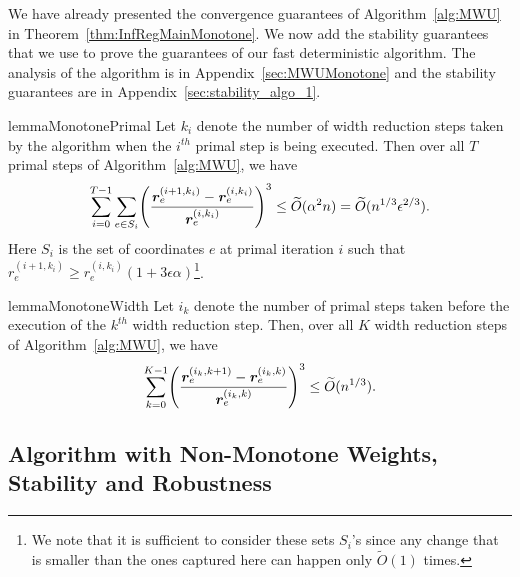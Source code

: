 \documentclass[11pt]{article}
\let\originalleft\left
\let\originalright\right
\renewcommand{\left}{\mathopen{}\mathclose\bgroup\originalleft}
\renewcommand{\right}{\aftergroup\egroup\originalright}
\newcommand\rr{\boldsymbol{\mathit{r}}}
\newcommand\Otil{\widetilde{O}}
\begin{document}
We have already presented the convergence guarantees of Algorithm~\ref{alg:MWU} in Theorem~\ref{thm:InfRegMainMonotone}. We now add the stability guarantees that we use to prove the guarantees of our fast deterministic algorithm. The analysis of the algorithm is in Appendix~\ref{sec:MWUMonotone} and the stability guarantees are in Appendix~\ref{sec:stability_algo_1}.


\begin{restatable}{lemma}{MonotonePrimal}
\label{lem:StabilityL3AllIterResistance}
Let $k_i$ denote the number of width reduction steps taken by the algorithm when the $i^{th}$ primal step is being executed. Then over all $T$ primal steps of Algorithm~\ref{alg:MWU}, we have
\[
\sum_{i=0}^{T-1} \sum_{e\in S_i} \left(\frac{\rr_e^{\left(i + 1,k_i\right)}-\rr_e^{\left(i,k_i \right)}}{\rr_e^{\left(i,k_i \right)}} \right)^3 \leq \Otil(\alpha^2 n) = \Otil(n^{1/3}\epsilon^{2/3}).
\]
Here $S_i$ is the set of coordinates $e$ at primal iteration $i$ such that $\rr_e^{(i+1,k_i)}\geq \rr_e^{(i,k_i)}(1+3\epsilon\alpha)$\footnote{We note that it is sufficient to consider these sets $S_i$'s since any change that is smaller than the ones captured here can happen only $\Otil(1)$ times.}.
\end{restatable}

\begin{restatable}{lemma}{MonotoneWidth}
\label{lem:StabilityL3AllWidth}
Let $i_k$ denote the number of primal steps taken before the execution of the $k^{th}$ width reduction step. Then, over all $K$ width reduction steps of Algorithm~\ref{alg:MWU}, we have
\[
\sum_{k=0}^{K-1} \left(\frac{\rr_e^{\left(i_k, k+1\right)}-\rr_e^{\left(i_k, k \right)}}{\rr_e^{\left(i_k, k \right)}} \right)^3 \leq \Otil(n^{1/3}).
\]
\end{restatable}

















\subsection{Algorithm with Non-Monotone Weights, Stability and Robustness}
\end{document}
